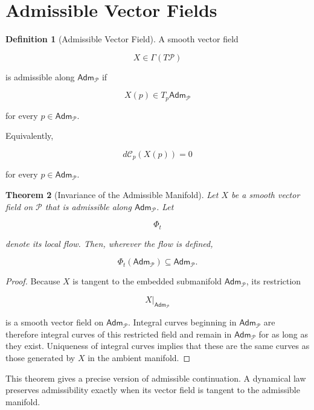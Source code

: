 \documentclass[11pt,oneside]{book}
\numberwithin{equation}{chapter}
\theoremstyle{definition}
\newtheorem{definition}{Definition}[chapter]
\theoremstyle{plain}
\newtheorem{theorem}[definition]{Theorem}
\newcommand{\Adm}{\mathsf{Adm}}
\begin{document}
\section{Admissible Vector Fields}

\begin{definition}[Admissible Vector Field]

A smooth vector field

\[
X\in\Gamma(T\mathcal P)
\]

is admissible along \(\Adm_{\mathcal P}\) if

\[
X(p)\in T_p\Adm_{\mathcal P}
\]

for every \(p\in\Adm_{\mathcal P}\).

Equivalently,

\[
d\mathcal C_p(X(p))=0
\]

for every \(p\in\Adm_{\mathcal P}\).

\end{definition}

\begin{theorem}[Invariance of the Admissible Manifold]

Let \(X\) be a smooth vector field on \(\mathcal P\) that is admissible along
\(\Adm_{\mathcal P}\). Let

\[
\Phi_t
\]

denote its local flow. Then, wherever the flow is defined,

\[
\Phi_t(\Adm_{\mathcal P})
\subseteq
\Adm_{\mathcal P}.
\]

\end{theorem}

\begin{proof}

Because \(X\) is tangent to the embedded submanifold
\(\Adm_{\mathcal P}\), its restriction

\[
X|_{\Adm_{\mathcal P}}
\]

is a smooth vector field on \(\Adm_{\mathcal P}\). Integral curves beginning
in \(\Adm_{\mathcal P}\) are therefore integral curves of this restricted
field and remain in \(\Adm_{\mathcal P}\) for as long as they exist.
Uniqueness of integral curves implies that these are the same curves as
those generated by \(X\) in the ambient manifold.

\end{proof}

This theorem gives a precise version of admissible continuation. A dynamical
law preserves admissibility exactly when its vector field is tangent to the
admissible manifold.
\end{document}
